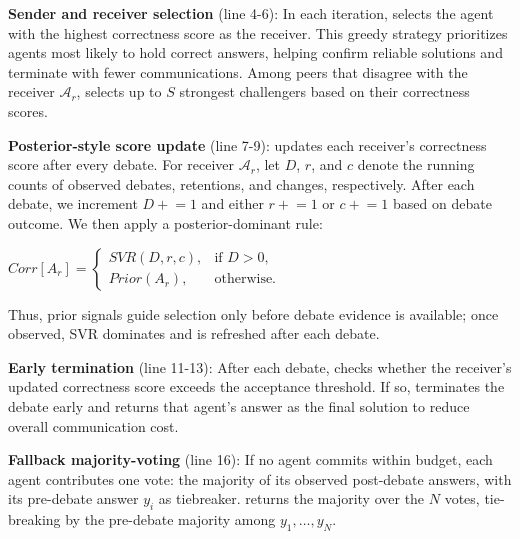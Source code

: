\noindent\textbf{Sender and receiver selection} (line 4-6): In each iteration, \sysname selects the agent with the highest correctness score as the receiver. This greedy strategy prioritizes agents most likely to hold correct answers, helping \sysname confirm reliable solutions and terminate with fewer communications. Among peers that disagree with the receiver $\mathcal{A}_{r}$, \sysname selects up to $S$ strongest challengers based on their correctness scores.

\noindent\textbf{Posterior-style score update} (line 7-9): \sysname updates each receiver's correctness score after every debate. For receiver $\mathcal{A}_{r}$, let $D$, $r$, and $c$ denote the running counts of observed debates, retentions, and changes, respectively. After each debate, we increment $D \mathrel{+}= 1$ and either $r \mathrel{+}= 1$ or $c \mathrel{+}= 1$ based on debate outcome. We then apply a posterior-dominant rule:

$Corr[A_r] =
\begin{cases}
SVR(D,r,c), & \text{if } D > 0,\\
Prior(A_r), & \text{otherwise.}
\end{cases}
$

Thus, prior signals guide selection only before debate evidence is available; once observed, SVR dominates and is refreshed after each debate.

\noindent\textbf{Early termination} (line 11-13): After each debate, \sysname checks whether the receiver's updated correctness score exceeds the acceptance threshold. If so, \sysname terminates the debate early and returns that agent's answer as the final solution to reduce overall communication cost.

\noindent\textbf{Fallback majority-voting} (line 16): If no agent commits within budget, each agent contributes one vote: the majority of its observed post-debate answers, with its pre-debate answer $y_i$ as tiebreaker. \sysname returns the majority over the $N$ votes, tie-breaking by the pre-debate majority among $y_1, \ldots, y_N$.

